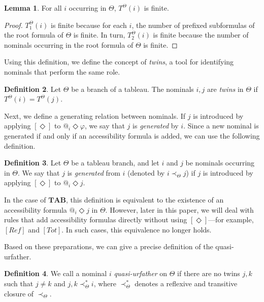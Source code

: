 \documentclass{article}
\theoremstyle{definition}
\newtheorem{definition}{Definition}[section]
\newtheorem{lemma}[definition]{Lemma}
\newcommand{\Dia}{\Diamond}
\newcommand{\tableau}{\mathbf{TAB}}
\newcommand{\reflex}{\mathit{Ref}}
\newcommand{\total}{\mathit{Tot}}
\begin{document}
\begin{lemma}
    For all $i$ occurring in $\Theta$, $T^\Theta(i)$ is finite.
\end{lemma}
\begin{proof}
    $T_1^\Theta(i)$ is finite because for each $i$, the number of prefixed subformulas of the root formula of $\Theta$ is finite. In turn, $T_2^\Theta(i)$ is finite because the number of nominals occurring in the root formula of $\Theta$ is finite.
\end{proof}

Using this definition, we define the concept of \emph{twins}, a tool for identifying nominals that perform the same role.

\begin{definition}
    Let $\Theta$ be a branch of a tableau. The nominals $i, j$ are \emph{twins} in $\Theta$ if $T^\Theta(i) = T^\Theta(j)$.
\end{definition}

Next, we define a generating relation between nominals. If $j$ is introduced by applying $[\Dia]$ to $@_i \Dia \varphi$, we say that $j$ is \emph{generated} by $i$. Since a new nominal is generated if and only if an accessibility formula is added, we can use the following definition.

\begin{definition}
    Let $\Theta$ be a tableau branch, and let $i$ and $j$ be nominals occurring in $\Theta$. We say that $j$ is \emph{generated} from $i$ (denoted by $i \prec_\Theta j$) if $j$ is introduced by applying $[\Dia]$ to $@_i \Dia j$.
    \label{defgenerate}
\end{definition}

In the case of $\tableau$, this definition is equivalent to the existence of an accessibility formula $@_i \Dia j$ in $\Theta$. However, later in this paper, we will deal with rules that add accessibility formulas directly without using $[\Dia]$---for example, $[\reflex]$ and $[\total]$. In such cases, this equivalence no longer holds.

Based on these preparations, we can give a precise definition of the quasi-urfather.

\begin{definition}
    We call a nominal $i$ \emph{quasi-urfather} on $\Theta$ if there are no twins $j, k$ such that $j \neq k$ and $j, k \prec_\Theta^* i$, where $\prec_\Theta^*$ denotes a reflexive and transitive closure of $\prec_\Theta$.
    \label{defqur}
\end{definition}
\end{document}
